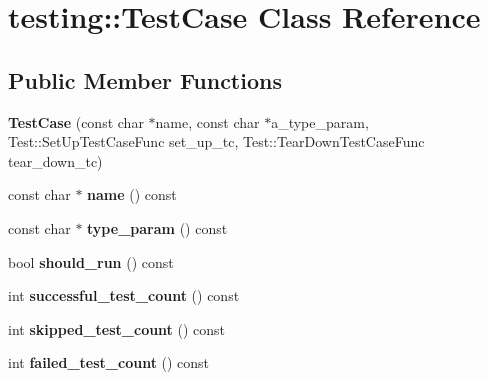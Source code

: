 \hypertarget{classtesting_1_1_test_case}{}\section{testing\+:\+:Test\+Case Class Reference}
\label{classtesting_1_1_test_case}
\subsection*{Public Member Functions}
\begin{DoxyCompactItemize}
\item 
\mbox{\label{classtesting_1_1_test_case_a8a43b04703bfc7d56597fcb9b76ffbf5}} 
{\bfseries Test\+Case} (const char $\ast$name, const char $\ast$a\+\_\+type\+\_\+param, Test\+::\+Set\+Up\+Test\+Case\+Func set\+\_\+up\+\_\+tc, Test\+::\+Tear\+Down\+Test\+Case\+Func tear\+\_\+down\+\_\+tc)
\item 
\mbox{\label{classtesting_1_1_test_case_a3f1beb98d5f7e3b037a4ec82b64cc1cf}} 
const char $\ast$ {\bfseries name} () const
\item 
\mbox{\label{classtesting_1_1_test_case_a9df62c4104a4f856b477c9e8335bb689}} 
const char $\ast$ {\bfseries type\+\_\+param} () const
\item 
\mbox{\label{classtesting_1_1_test_case_a843d6cd43f3e587bfa8681990b9d59df}} 
bool {\bfseries should\+\_\+run} () const
\item 
\mbox{\label{classtesting_1_1_test_case_ab61929942a202f03903182866bd0e086}} 
int {\bfseries successful\+\_\+test\+\_\+count} () const
\item 
\mbox{\label{classtesting_1_1_test_case_addf54f8f043bf7103795d879ea84588a}} 
int {\bfseries skipped\+\_\+test\+\_\+count} () const
\item 
\mbox{\label{classtesting_1_1_test_case_a70e26eb070c75ae62a191fa610ea234f}} 
int {\bfseries failed\+\_\+test\+\_\+count} () const
\item 
\mbox{\label{classtesting_1_1_test_case_ad6b34335955967bc361b2fbacd2dd6c9}} 

\end{DoxyCompactItemize}
